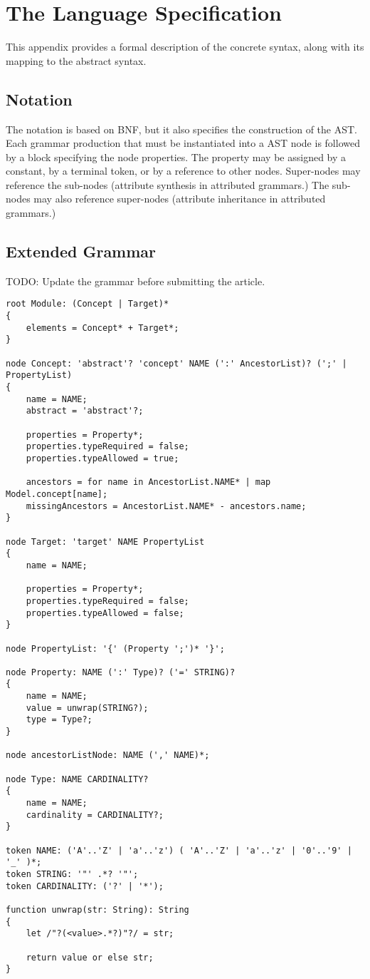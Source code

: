 \section{The Language Specification}\label{sec:spec}
%
This appendix provides a formal description of the concrete syntax, along with its mapping to the abstract syntax.

\subsection{Notation}

The notation is based on BNF, but it also specifies the construction of the AST. Each grammar production that must be instantiated into a AST node is followed by a block specifying the node properties. The property may be assigned by a constant, by a terminal token, or by a reference to other nodes. Super-nodes may reference the sub-nodes (attribute synthesis in attributed grammars.) The sub-nodes may also reference super-nodes (attribute inheritance in attributed grammars.) 

\subsection{Extended Grammar}

TODO: Update the grammar before submitting the article.

\verbatimfont{\tiny}
\begin{verbatim}
root Module: (Concept | Target)*
{
    elements = Concept* + Target*;
}

node Concept: 'abstract'? 'concept' NAME (':' AncestorList)? (';' | PropertyList)
{
    name = NAME;
    abstract = 'abstract'?;

    properties = Property*;
    properties.typeRequired = false;
    properties.typeAllowed = true;

    ancestors = for name in AncestorList.NAME* | map Model.concept[name];
    missingAncestors = AncestorList.NAME* - ancestors.name;
}

node Target: 'target' NAME PropertyList
{
    name = NAME;

    properties = Property*;
    properties.typeRequired = false;
    properties.typeAllowed = false;
}

node PropertyList: '{' (Property ';')* '}';

node Property: NAME (':' Type)? ('=' STRING)?
{
    name = NAME;
    value = unwrap(STRING?);
    type = Type?;
}

node ancestorListNode: NAME (',' NAME)*;

node Type: NAME CARDINALITY?
{
    name = NAME;
    cardinality = CARDINALITY?;
}

token NAME: ('A'..'Z' | 'a'..'z') ( 'A'..'Z' | 'a'..'z' | '0'..'9' | '_' )*;
token STRING: '"' .*? '"';
token CARDINALITY: ('?' | '*');

function unwrap(str: String): String
{
    let /"?(<value>.*?)"?/ = str;

    return value or else str;
}
\end{verbatim}
